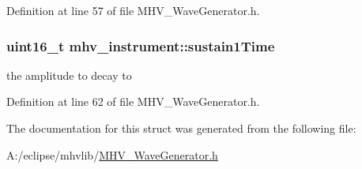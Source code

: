 Definition at line 57 of file M\-H\-V\-\_\-\-Wave\-Generator.\-h.

\hypertarget{structmhv__instrument_aff146a5abc59a0654d31089fe23d623e}{
\subsubsection[{sustain1\-Time}]{\setlength{\rightskip}{0pt plus 5cm}uint16\-\_\-t mhv\-\_\-instrument\-::sustain1\-Time}}\label{structmhv__instrument_aff146a5abc59a0654d31089fe23d623e}
the amplitude to decay to 

Definition at line 62 of file M\-H\-V\-\_\-\-Wave\-Generator.\-h.



The documentation for this struct was generated from the following file\-:\begin{DoxyCompactItemize}
\item 
A\-:/eclipse/mhvlib/\hyperlink{_m_h_v___wave_generator_8h}{M\-H\-V\-\_\-\-Wave\-Generator.\-h}\end{DoxyCompactItemize}
